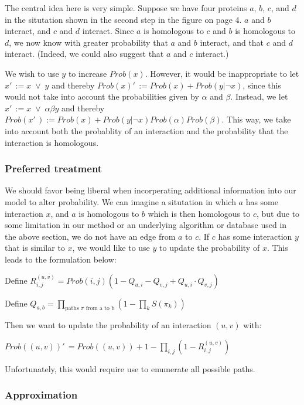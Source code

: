 \documentclass[12pt,twoside]{article}
\begin{document}
The central idea here is very simple. Suppose we have four proteins $a$, $b$, $c$, and $d$ in the situtation shown in the second step in the figure on page 4. $a$ and $b$ interact, and $c$ and $d$ interact. Since $a$ is homologous to $c$ and $b$ is homologous to $d$, we now know with greater probability that $a$ and $b$ interact, and that $c$ and $d$ interact. (Indeed, we could also suggest that $a$ and $c$ interact.)

We wish to use $y$ to increase $Prob(x)$. However, it would be inappropriate to let $x'\,\! := x \; \vee \; y$ and thereby $Prob(x)'\,\! := Prob(x) + Prob(y|\neg x)$, since this would not take into account the probabilities given by $\alpha$ and $\beta$. Instead, we let $x'\,\! := x \; \vee \; \alpha \beta y$ and thereby $Prob(x'\,\!) := Prob(x) + Prob(y | \neg x) Prob(\alpha) Prob(\beta)$. This way, we take into account both the probablity of an interaction and the probability that the interaction is homologous.

\subsubsection{Preferred treatment}

We should favor being liberal when incorperating additional information into our model to alter probability. We can imagine a situtation in which $a$ has some interaction $x$, and $a$ is homologous to $b$ which is then homologous to $c$, but due to some limitation in our method or an underlying algorithm or database used in the above section, we do not have an edge from $a$ to $c$. If $c$ has some interaction $y$ that is similar to $x$, we would like to use $y$ to update the probability of $x$. This leads to the formulation below:

Define
$R_{i,j}^{(u,v)} = Prob(i,j) \left(1 - \displaystyle Q_{u,i} - Q_{v,j} + Q_{u,i} \cdot Q_{v,j} \right)$

Define $Q_{a,b} = \displaystyle \prod_{\text{paths } \pi \text{ from a to b}} \left( 1 - \prod_{k} S(\pi_k) \right)$

Then we want to update the probability of an interaction $(u,v)$ with:

$Prob((u,v))'\,\! = Prob((u,v)) + 1 - \displaystyle \prod_{i,j}(1 - R_{i,j}^{(u,v)})$

Unfortunately, this would require use to enumerate all possible paths.

\subsubsection{Approximation}
\end{document}
